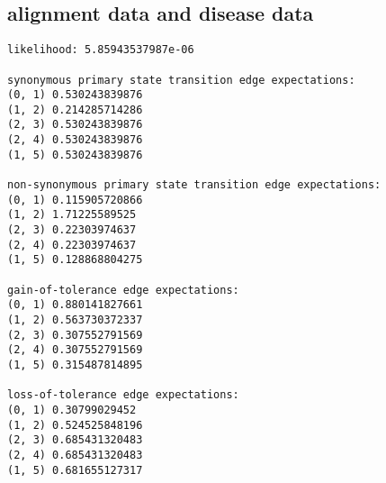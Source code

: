 \documentclass{article}
\begin{document}
\subsection{alignment data and disease data}
\begin{verbatim}
likelihood: 5.85943537987e-06

synonymous primary state transition edge expectations:
(0, 1) 0.530243839876
(1, 2) 0.214285714286
(2, 3) 0.530243839876
(2, 4) 0.530243839876
(1, 5) 0.530243839876

non-synonymous primary state transition edge expectations:
(0, 1) 0.115905720866
(1, 2) 1.71225589525
(2, 3) 0.22303974637
(2, 4) 0.22303974637
(1, 5) 0.128868804275

gain-of-tolerance edge expectations:
(0, 1) 0.880141827661
(1, 2) 0.563730372337
(2, 3) 0.307552791569
(2, 4) 0.307552791569
(1, 5) 0.315487814895

loss-of-tolerance edge expectations:
(0, 1) 0.30799029452
(1, 2) 0.524525848196
(2, 3) 0.685431320483
(2, 4) 0.685431320483
(1, 5) 0.681655127317
\end{verbatim}
\end{document}
